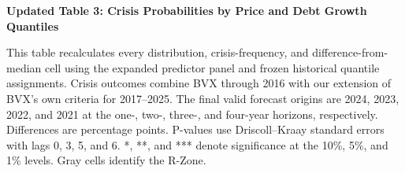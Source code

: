 \documentclass[11pt]{article}
\begin{document}
\noindent\textbf{Updated Table 3: Crisis Probabilities by Price and Debt Growth Quantiles}

\smallskip
\noindent\footnotesize
This table recalculates every distribution, crisis-frequency, and
difference-from-median cell using the expanded predictor panel and frozen
historical quantile assignments. Crisis outcomes combine BVX through 2016 with
our extension of BVX's own criteria for 2017--2025. The final valid
forecast origins are 2024, 2023, 2022, and 2021 at the one-, two-, three-, and
four-year horizons, respectively. Differences are percentage points. P-values
use Driscoll--Kraay standard errors with lags 0, 3, 5, and 6. *, **, and ***
denote significance at the 10\%, 5\%, and 1\% levels. Gray cells identify the
R-Zone.

\normalsize
\medskip

\end{document}
